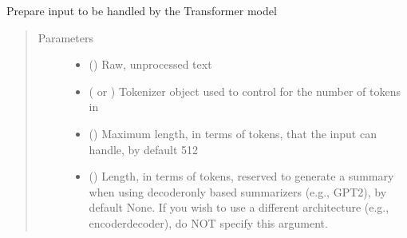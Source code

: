 \documentclass[letterpaper,10pt,english]{sphinxmanual}
\begin{document}

\begin{fulllineitems}
\label{\detokenize{code:utils.prepare_input_summarizer}}
\sphinxAtStartPar
Prepare input to be handled by the Transformer model
\begin{quote}\begin{description}
\item[{Parameters}] \leavevmode\begin{itemize}
\item {} 
\sphinxAtStartPar
{} () \textendash{} Raw, unprocessed text

\item {} 
\sphinxAtStartPar
{} ( or ) \textendash{} Tokenizer object used to control for the number of tokens in 

\item {} 
\sphinxAtStartPar
{} (\sphinxstyleliteralemphasis{\sphinxupquote{, }}) \textendash{} Maximum length, in terms of tokens, that the input can handle, by default 512

\item {} 
\sphinxAtStartPar
{} (\sphinxstyleliteralemphasis{\sphinxupquote{, }}) \textendash{} Length, in terms of tokens, reserved to generate a summary when using decoder\sphinxhyphen{}only
based summarizers (e.g., GPT\sphinxhyphen{}2), by default None. If you wish to use a different
architecture (e.g., encoder\sphinxhyphen{}decoder), do NOT specify this argument.


\end{itemize}
\end{description}
\end{quote}
\end{fulllineitems}
\end{document}

